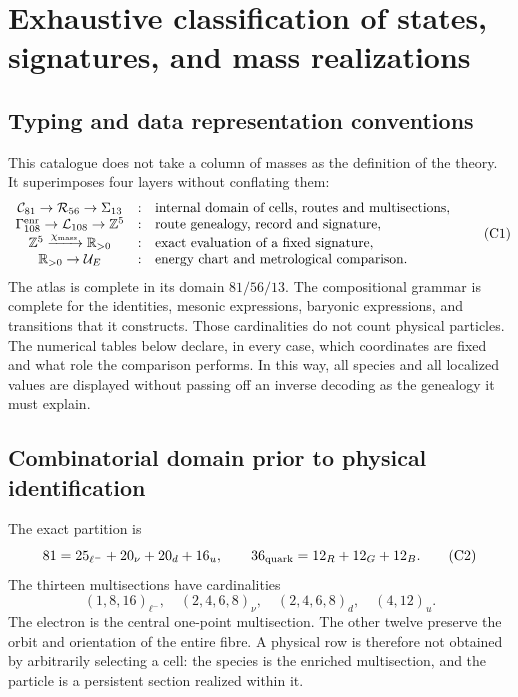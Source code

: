 \chapter{Exhaustive classification of states, signatures, and mass realizations}
\label{app:catalogo-cientifico-masas-rev6}

\section{Typing and data representation conventions}

This catalogue does not take a column of masses as the definition of the theory.
It superimposes four layers without conflating them:
\[
\begin{array}{ccl}
\mathcal C_{81}\to\mathcal R_{56}\to\Sigma_{13}
&:&\text{internal domain of cells, routes and multisections},\\
\Gamma_{108}^{\rm enr}\to\mathcal L_{108}\to\mathbb Z^5
&:&\text{route genealogy, record and signature},\\
\mathbb Z^5\xrightarrow{\chi_{\rm mass}}\mathbb R_{>0}
&:&\text{exact evaluation of a fixed signature},\\
\mathbb R_{>0}\to\mathcal U_E
&:&\text{energy chart and metrological comparison}.
\end{array}
\tag{C1}\label{eq:cuatro-capas-catalogo-masas}
\]
The atlas is complete in its domain \(81/56/13\). The compositional grammar
is complete for the identities, mesonic expressions, baryonic
expressions, and transitions that it constructs. Those cardinalities do not count
physical particles. The numerical tables below declare, in every case, which
coordinates are fixed and what role the comparison performs. In this way,
all species and all localized values are displayed without passing off an
inverse decoding as the genealogy it must explain.

\section{Combinatorial domain prior to physical identification}

The exact partition is
\[
81=25_{\ell^-}+20_\nu+20_d+16_u,
\qquad
36_{\rm quark}=12_R+12_G+12_B.
\tag{C2}\label{eq:dominio-catalogo-masas}
\]
The thirteen multisections have cardinalities
\[
(1,8,16)_{\ell^-},\quad
(2,4,6,8)_\nu,\quad
(2,4,6,8)_d,\quad
(4,12)_u.
\tag{C3}\label{eq:trece-cardinales-catalogo}
\]
The electron is the central one-point multisection. The other twelve preserve
the orbit and orientation of the entire fibre. A physical row is therefore not
obtained by arbitrarily selecting a cell: the species is the enriched
multisection, and the particle is a persistent section realized within it.


